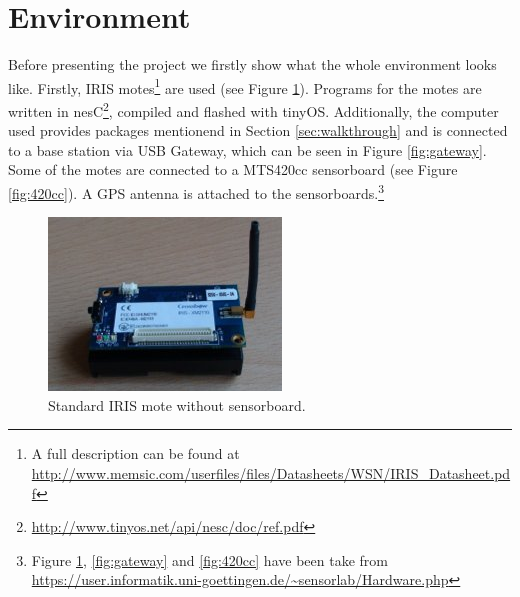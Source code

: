 \documentclass[a4paper]{article}
\newcommand{\mts}{MTS420cc }
\begin{document}
\section{Environment}
Before presenting the project we firstly show what the whole environment looks like. Firstly, IRIS motes\footnote{A full description can be found at \url{http://www.memsic.com/userfiles/files/Datasheets/WSN/IRIS_Datasheet.pdf}} are used (see Figure \ref{fig:mote}). Programs for the motes are written in nesC\footnote{\url{http://www.tinyos.net/api/nesc/doc/ref.pdf}}, compiled and flashed with tinyOS. Additionally, the computer used provides packages mentionend in Section \ref{sec:walkthrough} and is connected to a base station via USB Gateway, which can be seen in Figure \ref{fig:gateway}. Some of the motes are connected to a \mts sensorboard (see Figure \ref{fig:420cc}). A GPS antenna is attached to the sensorboards.\footnote{Figure \ref{fig:mote}, \ref{fig:gateway} and \ref{fig:420cc} have been take from \url{https://user.informatik.uni-goettingen.de/~sensorlab/Hardware.php}}
\begin{figure}[h!]
\begin{center}
\includegraphics[scale=0.75]{pics/mote.jpg}
\caption{Standard IRIS mote without sensorboard.}
\label{fig:mote}
\end{center}
\end{figure}
\end{document}
